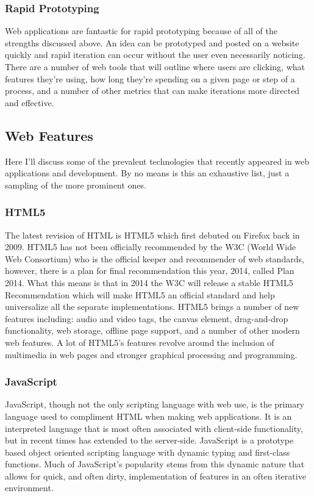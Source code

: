 \documentclass[11pt]{article}
\begin{document}
\begin{multicols}{2}
\subsubsection{Rapid Prototyping}
Web applications are fantastic for rapid prototyping because of all of the strengths discussed above. An idea can be prototyped and posted on a website quickly and rapid iteration can occur without the user even necessarily noticing. There are a number of web tools that will outline where users are clicking, what features they're using, how long they're spending on a given page or step of a process, and a number of other metrics that can make iterations more directed and effective.


\subsection{Web Features}
Here I'll discuss some of the prevalent technologies that recently appeared in web applications and development. By no means is this an exhaustive list, just a sampling of the more prominent ones.

\subsubsection{HTML5}
The latest revision of HTML is HTML5 which first debuted on Firefox back in 2009. \cite{EvolutionOfWeb} HTML5 has not been officially recommended by the W3C (World Wide Web Consortium) who is the official keeper and recommender of web standards, however, there is a plan for final recommendation this year, 2014, called Plan 2014. \cite{Plan2014} What this means is that in 2014 the W3C will release a stable HTML5 Recommendation which will make HTML5 an official standard and help universalize all the separate implementations.
HTML5 brings a number of new features including: audio and video tags, the canvas element, drag-and-drop functionality, web storage, offline page support, and a number of other modern web features. A lot of HTML5's features revolve around the inclusion of multimedia in web pages and stronger graphical processing and programming.

\subsubsection{JavaScript}
JavaScript, though not the only scripting language with web use, is the primary language used to compliment HTML when making web applications. It is an interpreted language that is most often associated with client-side functionality, but in recent times has extended to the server-side. JavaScript is a prototype based object oriented scripting language with dynamic typing and first-class functions. Much of JavaScript's popularity stems from this dynamic nature that allows for quick, and often dirty, implementation of features in an often iterative environment.


\end{multicols}
\end{document}
